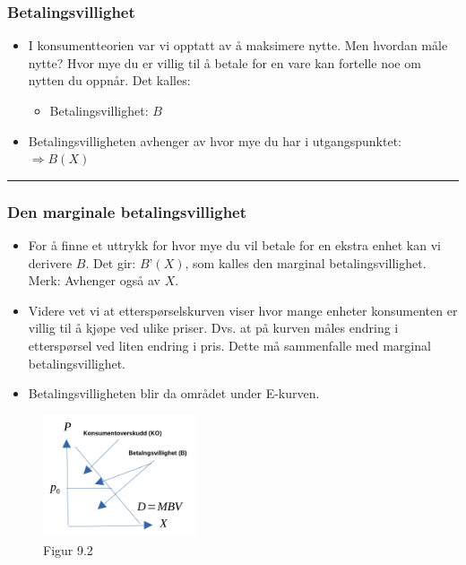 \documentclass[
  letterpaper,
  DIV=11,
  numbers=noendperiod]{scrartcl}
\providecommand{\tightlist}{%
  \setlength{\itemsep}{0pt}\setlength{\parskip}{0pt}}\usepackage{longtable,booktabs,array}
\begin{document}
\subsubsection{Betalingsvillighet}\label{betalingsvillighet}

\begin{itemize}
\tightlist
\item
  I konsumentteorien var vi opptatt av å maksimere nytte. Men hvordan
  måle nytte? Hvor mye du er villig til å betale for en vare kan
  fortelle noe om nytten du oppnår. Det kalles:

  \begin{itemize}
  \tightlist
  \item
    Betalingsvillighet: \(B\)
  \end{itemize}
\item
  Betalingsvilligheten avhenger av hvor mye du har i utgangspunktet:
  \(\Rightarrow B(X)\)
\end{itemize}

\begin{center}\rule{0.5\linewidth}{0.5pt}\end{center}

\subsubsection{Den marginale
betalingsvillighet}\label{den-marginale-betalingsvillighet}

\begin{itemize}
\tightlist
\item
  For å finne et uttrykk for hvor mye du vil betale for en ekstra enhet
  kan vi derivere \(B\). Det gir: \(B’(X)\), som kalles den marginal
  betalingsvillighet. Merk: Avhenger også av \(X\).
\item
  Videre vet vi at etterspørselskurven viser hvor mange enheter
  konsumenten er villig til å kjøpe ved ulike priser. Dvs. at på kurven
  måles endring i etterspørsel ved liten endring i pris. Dette må
  sammenfalle med marginal betalingsvillighet.
\item
  Betalingsvilligheten blir da området under E-kurven.
\end{itemize}

\begin{figure}[H]

{\centering \includegraphics[width=0.4\textwidth,height=\textheight]{drawio/konso.png}

}

\caption{Figur 9.2}

\end{figure}%
\end{document}
